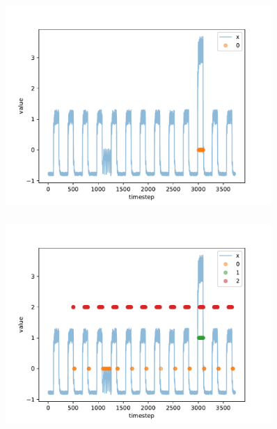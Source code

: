 \documentclass[hyperref={pdfpagelabels=false}]{beamer}
\begin{document}
\begin{frame}[label=]
\frametitle{}
\begin{figure}[H] 
  \centering
\includegraphics[width=0.9\textwidth]{../imgs/1d3}
\label{fig:1d3}
  \end{figure}


\end{frame}

\begin{frame}[label=]
\frametitle{}
\begin{figure}[H] 
  \centering
\includegraphics[width=0.9\textwidth]{../imgs/3d3}
\label{fig:3d3}
  \end{figure}


\end{frame}
\end{document}
